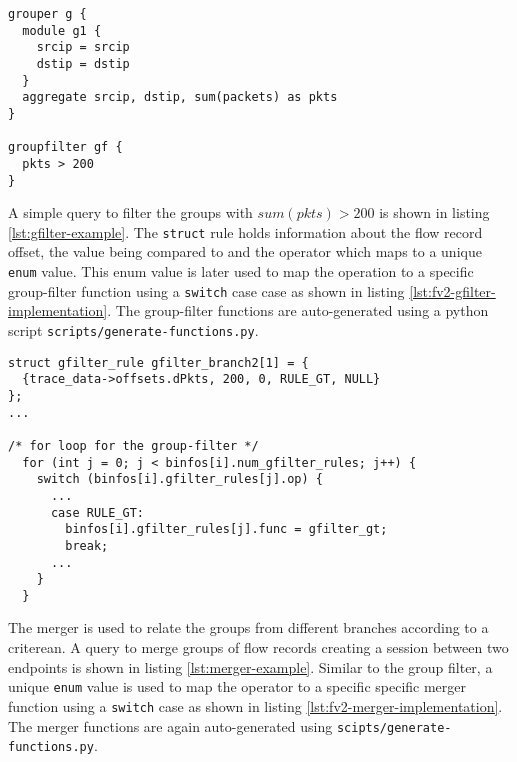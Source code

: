 \begin{lstlisting}
grouper g {
  module g1 {
    srcip = srcip
    dstip = dstip
  }
  aggregate srcip, dstip, sum(packets) as pkts
}

groupfilter gf {
  pkts > 200
}
\end{lstlisting}

A simple query to filter the groups with $sum(pkts) > 200$ is shown in listing
\ref{lst:gfilter-example}. The \texttt{struct} rule holds information about
the flow record offset, the value 
being compared to and the operator which maps to a unique \texttt{enum} value.
This enum value is later used to map the operation to a specific group-filter
function using a \texttt{switch} case case as shown in listing
\ref{lst:fv2-gfilter-implementation}. The group-filter functions are
auto-generated using a python script \texttt{scripts/generate-functions.py}.

\begin{lstlisting}
struct gfilter_rule gfilter_branch2[1] = {
  {trace_data->offsets.dPkts, 200, 0, RULE_GT, NULL}
};
...

/* for loop for the group-filter */
  for (int j = 0; j < binfos[i].num_gfilter_rules; j++) {
    switch (binfos[i].gfilter_rules[j].op) {
      ...
      case RULE_GT:
        binfos[i].gfilter_rules[j].func = gfilter_gt;
        break;
      ...
    }
  }
\end{lstlisting}

The merger is used to relate the groups from different branches according to a
criterean. A query to merge groups of flow records creating a session between
two endpoints is shown in listing \ref{lst:merger-example}. Similar to the
group filter, a unique  \texttt{enum} value
is used to map the operator to a specific specific merger function using a
\texttt{switch} case as shown in listing \ref{lst:fv2-merger-implementation}.
The merger functions are again auto-generated using
\texttt{scipts/generate-functions.py}.

